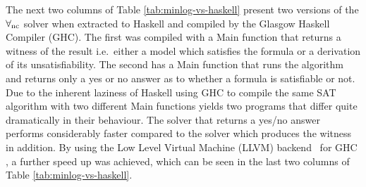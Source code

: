 %
%
The next two columns of Table \ref{tab:minlog-vs-haskell} present two versions of the $\forall_{\mathrm{nc}}$ solver when extracted to Haskell and compiled by the Glasgow Haskell Compiler (GHC). The first was compiled with a Main function that returns a witness of the result i.e.\ either a model which satisfies the formula or a derivation of its unsatisfiability. The second has a Main function that runs the algorithm and returns only a yes or no answer as to whether a formula is satisfiable or not. Due to the inherent laziness of Haskell using GHC to compile the same SAT algorithm with two different Main functions yields two programs that differ quite dramatically in their behaviour. The solver that returns a yes/no answer performs considerably faster compared to the solver which produces the witness in addition. By using the Low Level Virtual Machine (LLVM) backend~\cite{CL04} for GHC%
, a further speed up was achieved, which can be seen in the last two columns of Table \ref{tab:minlog-vs-haskell}.

